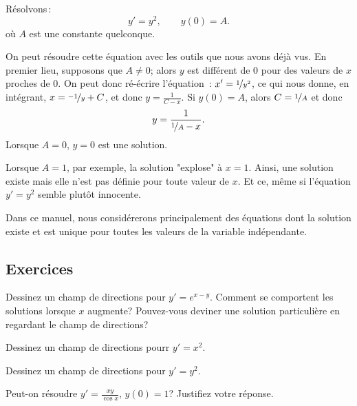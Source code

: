 \begin{example}
Résolvons\,:
\begin{equation*}
y' = y^2, \qquad y(0) = A .
\end{equation*}
où $A$ est une constante quelconque.

On peut résoudre cette équation avec les outils que nous avons déjà vus.  En premier lieu, supposons que $A \not= 0$;
alors $y$ est différent de 0 pour des valeurs de $x$ proches de 0.  On peut donc ré-écrire l'équation \,: 
$x' = \nicefrac{1}{y^2}$, ce qui nous donne, en intégrant, 
$x = \nicefrac{-1}{y} + C$, et donc $y = \frac{1}{C-x}$.  Si $y(0) = A$, alors
$C = \nicefrac{1}{A}$ et donc 
\begin{equation*}
y = \frac{1}{\nicefrac{1}{A} - x} .
\end{equation*}
Lorsque $A=0$,  $y=0$ est une solution.

Lorsque $A=1$, par exemple, la solution "explose" à  $x=1$.  Ainsi, une solution existe mais elle n'est pas définie pour toute valeur de $x$.  Et ce, même si l'équation $y' = y^2$ semble plutôt innocente.
\end{example}

Dans ce manuel, nous considérerons principalement des équations dont la solution existe et est unique pour toutes les
valeurs de la variable indépendante.

\subsection{Exercices}

\begin{exercise}
Dessinez un champ de directions pour $y'=e^{x-y}$.  Comment se comportent les solutions lorsque $x$ augmente? Pouvez-vous deviner une solution particulière en regardant le champ de directions?
\end{exercise}

\begin{exercise}
Dessinez un champ de directions pourr $y'=x^2$.
\end{exercise}

\begin{exercise}
Dessinez un champ de directions pour $y'=y^2$.
\end{exercise}

\begin{exercise}
Peut-on résoudre $y' = \frac{xy}{\cos x}$, $y(0) = 1$?
Justifiez votre réponse.
\end{exercise}

